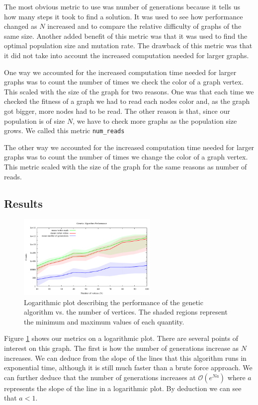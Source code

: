 \documentclass{article}
\begin{document}
	The most obvious metric to use was number of generations because it tells us how many steps it took to find a solution. It was used to see how performance changed as $N$ increased and to compare the relative difficulty of graphs of the same size. Another added benefit of this metric was that it was used to find the optimal population size and mutation rate. The drawback of this metric was that it did not take into account the increased computation needed for larger graphs.
	
	One way we accounted for the increased computation time needed for larger graphs was to count the number of times we check the color of a graph vertex. This scaled with the size of the graph for two reasons. One was that each time we checked the fitness of a graph we had to read each nodes color and, as the graph got bigger, more nodes had to be read. The other reason is that, since our population is of size $N$, we have to check more graphs as the population size grows. We called this metric \texttt{num\_reads}
	
	The other way we accounted for the increased computation time needed for larger graphs was to count the number of times we change the color of a graph vertex. This metric scaled with the size of the graph for the same reasons as number of reads.
	
	\subsection{Results}
	\begin{figure}[h!]
		\centering
		\includegraphics[width=0.6\textwidth]{../results_5/genetic/genetic_performance}
		\caption{Logarithmic plot describing the performance of the genetic algorithm vs. the number of vertices. The shaded regions represent the minimum and maximum values of each quantity.}
		\label{genetic_Performance}
	\end{figure}
	
	Figure \ref{genetic_Performance} shows our metrics on a logarithmic plot. There are several points of interest on this graph. The first is how the number of generations increase as $N$ increases. We can deduce from the slope of the lines that this algorithm runs in exponential time, although it is still much faster than a brute force approach. We can further deduce that the number of generations increases at $\mathcal{O} (e^{Na})$ where $a$ represents the slope of the line in a logarithmic plot. By deduction we can see that  $a<1$.
	
\end{document}

